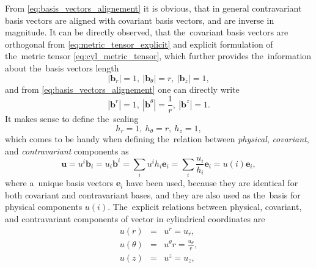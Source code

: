 \documentclass[preprint,12pt]{elsarticle}
\newcommand{\vect}[1]{\boldsymbol{#1}}
\begin{document}
From \eqref{eq:basis_vectors_alignement} it is obvious, 
that in general contravariant basis vectors are aligned with covariant basis 
vectors, and are inverse in magnitude.
It can be directly observed, that the~covariant basis vectors are orthogonal
from \eqref{eq:metric_tensor_explicit} and explicit formulation of 
the~metric tensor \eqref{eq:cyl_metric_tensor}, which further provides
the~information about the~basis vectors length
\begin{equation}
  |\vect{b}_r| = 1,~ |\vect{b}_\theta| = r,~ |\vect{b}_z| = 1,
  \nonumber
\end{equation} 
and from \eqref{eq:basis_vectors_alignement} one can directly write
\begin{equation}
  |\vect{b}^r| = 1,~ |\vect{b}^\theta| = \frac{1}{r},~ 
  |\vect{b}^z| = 1.
  \nonumber
\end{equation}
It makes sense to define the~scaling
\begin{equation}
  h_r = 1,~ h_\theta = r,~ h_z = 1,
  \label{eq:cyl_scaling}
\end{equation} 
which comes to be handy when defining the~relation between 
\textit{physical}, \textit{covariant}, and \textit{contravariant} components as
\begin{equation}
  \vect{u} = u^i \vect{b}_i = u_i \vect{b}^i = \sum_i u^i h_i \vect{e}_i
  = \sum_i \frac{u_i}{h_i} \vect{e}_i = u(i) \vect{e}_i,
  \label{eq:cyl_components}
\end{equation}
where a~unique basis vectors $\vect{e}_i$ have been used, because they are 
identical for both covariant and contravariant bases, and they are also used
as the~basis for physical components $u(i)$.
The~explicit relations between physical, covariant, and contravariant components
of vector in cylindrical coordinates are
\begin{eqnarray}
  u(r) &=& u^r = u_r , \nonumber\\
  u(\theta) &=& u^\theta r = \frac{u_\theta}{r} , 
  \nonumber\\
  u(z) &=& u^z = u_z , 
  \label{eq:cyl_physical_components}
\end{eqnarray}
\end{document}
